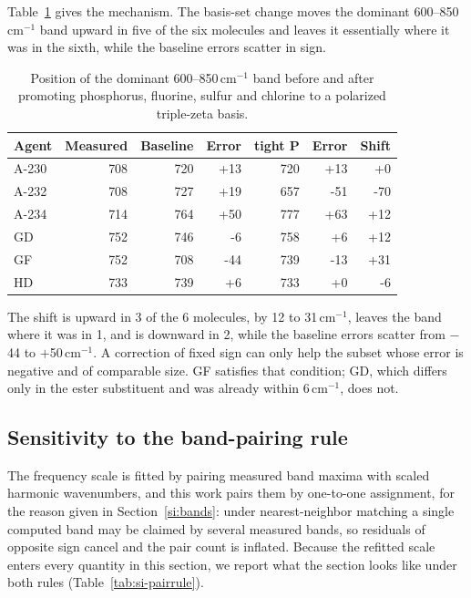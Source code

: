 \documentclass[11pt]{article}
\newcommand*\wn{\ensuremath{\text{cm}^{-1}}}
\begin{document}
Table~\ref{tab:si-bandshift} gives the mechanism. The basis-set change moves the dominant
600--850\,\wn{} band upward in five of the six molecules and leaves it essentially where it
was in the sixth, while the baseline errors scatter in sign.

\begin{table}[htbp]
\centering
\caption{Position of the dominant 600--850\,\wn{} band before and after promoting phosphorus, fluorine, sulfur and chlorine to a polarized triple-zeta basis.}
\label{tab:si-bandshift}
\small
\begin{tabular}{lrrrrrr}
\toprule
Agent & Measured & Baseline & Error & tight P & Error & Shift \\
\midrule
A-230 & 708 & 720 & +13 & 720 & +13 & +0 \\
A-232 & 708 & 727 & +19 & 657 & -51 & -70 \\
A-234 & 714 & 764 & +50 & 777 & +63 & +12 \\
GD & 752 & 746 & -6 & 758 & +6 & +12 \\
GF & 752 & 708 & -44 & 739 & -13 & +31 \\
HD & 733 & 739 & +6 & 733 & +0 & -6 \\
\bottomrule
\end{tabular}

\begin{flushleft}\footnotesize The shift is upward in 3 of the 6 molecules, by 12 to 31\,\wn{}, leaves the band where it was in 1, and is downward in 2, while the baseline errors scatter from $-$44 to $+$50\,\wn{}. A correction of fixed sign can only help the subset whose error is negative and of comparable size. GF satisfies that condition; GD, which differs only in the ester substituent and was already within 6\,\wn{}, does not.\end{flushleft}
\end{table}
\clearpage

\subsection{Sensitivity to the band-pairing rule}
\label{si:pairrule}

The frequency scale is fitted by pairing measured band maxima with scaled harmonic
wavenumbers, and this work pairs them by one-to-one assignment, for the reason given in
Section~\ref{si:bands}: under nearest-neighbor matching a single computed band may be
claimed by several measured bands, so residuals of opposite sign cancel and the pair count
is inflated. Because the refitted scale enters every quantity in this section, we report
what the section looks like under both rules (Table~\ref{tab:si-pairrule}).
\end{document}
